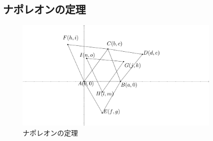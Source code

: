 \documentclass[dvipdfmx]{jsarticle}
\begin{document}
    \subsection{ナポレオンの定理}
    \begin{figure}[H]
        \centering
        \includegraphics[width=10cm]{Napoleon.png}
        \caption{ナポレオンの定理}
    \end{figure}
\end{document}
